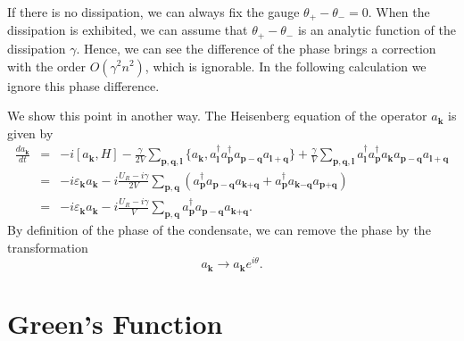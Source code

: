 \documentclass[aps,onecolumn,superscriptaddress,notitlepage,longbibliography]{revtex4-1}
\newcommand{\tmmathbf}[1]{\ensuremath{\boldsymbol{#1}}}
\begin{document}
If there is no dissipation, we can always fix the gauge $\theta_+ - \theta_- =
0$. When the dissipation is exhibited, we can assume that $\theta_+ -
\theta_-$ is an analytic function of the dissipation $\gamma$. Hence, we can
see the difference of the phase brings a correction with the order $O
(\gamma^2 n^2)$, which is ignorable. In the following calculation we ignore
this phase difference.

We show this point in another way. The Heisenberg equation of the operator
$a_{\tmmathbf{k}}$ is given by
\begin{eqnarray}
  \frac{d a_{\tmmathbf{k}}}{d t} & = & - i [a_{\tmmathbf{k}}, H] -
  \frac{\gamma}{2 V} \sum_{\tmmathbf{p}, \tmmathbf{q}, \tmmathbf{l}} \{
  a_{\tmmathbf{k}}, a_{\tmmathbf{l}}^{\dagger} a^{\dagger}_{\tmmathbf{p}}
  a_{\tmmathbf{p -} \tmmathbf{q}} a_{\tmmathbf{l +} \tmmathbf{q}} \} +
  \frac{\gamma}{V} \sum_{\tmmathbf{p}, \tmmathbf{q}, \tmmathbf{l}}
  a_{\tmmathbf{l}}^{\dagger} a^{\dagger}_{\tmmathbf{p}} a_{\tmmathbf{k}}
  a_{\tmmathbf{p -} \tmmathbf{q}} a_{\tmmathbf{l +} \tmmathbf{q}} \nonumber\\
  & = & - i \varepsilon_{\tmmathbf{k}} a_{\tmmathbf{k}} - i \frac{U_R - i
  \gamma}{2 V} \sum_{\tmmathbf{p}, \tmmathbf{q}} (a^{\dagger}_{\tmmathbf{p}}
  a_{\tmmathbf{p -} \tmmathbf{q}} a_{\tmmathbf{k} \tmmathbf{+} \tmmathbf{q}} +
  a^{\dagger}_{\tmmathbf{p}} a_{\tmmathbf{k} \tmmathbf{-} \tmmathbf{q}}
  a_{\tmmathbf{p} \tmmathbf{+} \tmmathbf{q}}) \nonumber\\
  & = & - i \varepsilon_{\tmmathbf{k}} a_{\tmmathbf{k}} - i \frac{U_R - i
  \gamma}{V} \sum_{\tmmathbf{p}, \tmmathbf{q}} a^{\dagger}_{\tmmathbf{p}}
  a_{\tmmathbf{p -} \tmmathbf{q}} a_{\tmmathbf{k} \tmmathbf{+} \tmmathbf{q}} .
\end{eqnarray}
By definition of the phase of the condensate, we can remove the phase by the
transformation
\begin{equation}
  a_{\tmmathbf{k}} \rightarrow a_{\tmmathbf{k}} e^{i \theta} .
\end{equation}

\section{Green's Function}
\end{document}
